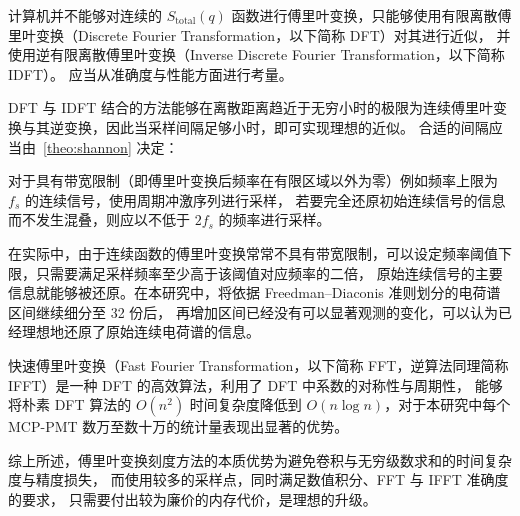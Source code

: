 计算机并不能够对连续的 $S_{\text{total}}(q)$ 函数进行傅里叶变换，只能够使用有限离散傅里叶变换（Discrete Fourier Transformation，以下简称 DFT）对其进行近似，
并使用逆有限离散傅里叶变换（Inverse Discrete Fourier Transformation，以下简称 IDFT）。
应当从准确度与性能方面进行考量。

DFT 与 IDFT 结合的方法能够在离散距离趋近于无穷小时的极限为连续傅里叶变换与其逆变换，因此当采样间隔足够小时，即可实现理想的近似。
合适的间隔应当由~\ref{theo:shannon} 决定：
\begin{theorem}\label{theo:shannon}
    对于具有带宽限制（即傅里叶变换后频率在有限区域以外为零）例如频率上限为 $f_s$ 的连续信号，使用周期冲激序列进行采样，
    若要完全还原初始连续信号的信息而不发生混叠，则应以不低于 $2f_s$ 的频率进行采样。
\end{theorem}

在实际中，由于连续函数的傅里叶变换常常不具有带宽限制，可以设定频率阈值下限，只需要满足采样频率至少高于该阈值对应频率的二倍，
原始连续信号的主要信息就能够被还原。在本研究中，将依据 Freedman–Diaconis 准则划分的电荷谱区间继续细分至 32 份后，
再增加区间已经没有可以显著观测的变化，可以认为已经理想地还原了原始连续电荷谱的信息。

快速傅里叶变换（Fast Fourier Transformation，以下简称 FFT，逆算法同理简称 IFFT）是一种 DFT 的高效算法，利用了 DFT 中系数的对称性与周期性，
能够将朴素 DFT 算法的 $O(n^2)$ 时间复杂度降低到 $O(n\log{n})$，对于本研究中每个 MCP-PMT 数万至数十万的统计量表现出显著的优势。

综上所述，傅里叶变换刻度方法的本质优势为避免卷积与无穷级数求和的时间复杂度与精度损失，
而使用较多的采样点，同时满足数值积分、FFT 与 IFFT 准确度的要求，
只需要付出较为廉价的内存代价，是理想的升级。
